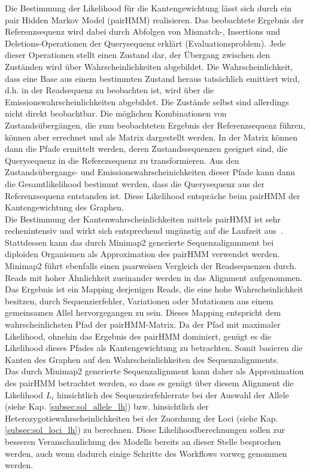 Die Bestimmung der Likelihood für die Kantengewichtung lässt sich durch ein pair Hidden Markov Model (pairHMM) \cite{durbin_1998} realisieren. Das beobachtete Ergebnis der Referenzsequenz wird dabei durch Abfolgen von Mismatch-, Insertions und Deletions-Operationen der Querysequenz erklärt (Evaluationsproblem). Jede dieser Operationen stellt einen Zustand dar, der Übergang zwischen den Zuständen wird über Wahrscheinlichkeiten abgebildet. Die Wahrscheinlichkeit, dass eine Base aus einem bestimmten Zustand heraus tatsächlich emittiert wird, d.h. in der Readsequenz zu beobachten ist, wird über die Emissionswahrscheinlichkeiten abgebildet. Die Zustände selbst sind allerdings nicht direkt beobachtbar. Die möglichen Kombinationen von Zustandsübergängen, die zum beobachteten Ergebnis der Referenzsequenz führen, können aber errechnet und als Matrix dargestellt werden. In der Matrix können dann die Pfade ermittelt werden, deren Zustandssequenzen geeignet sind, die Querysequenz in die Referezsequenz zu transformieren. Aus den Zustandsübergangs- und Emissionswahrscheinichkeiten dieser Pfade kann dann die Gesamtlikelihood bestimmt werden, dass die Querysequenz aus der Referenzsequenz entstanden ist. Diese Likelihood entspräche beim pairHMM der Kantengewichtung des Graphen. \\

Die Bestimmung der Kantenwahrscheinlichkeiten mittels pairHMM ist sehr rechenintensiv und wirkt sich entsprechend ungünstig auf die Laufzeit aus~\cite{durbin_1998, yoon_2009}. Stattdessen kann das durch Minimap2 generierte Sequenzalignmment bei diploiden Organismen als Approximation des pairHMM verwendet werden. Minimap2 führt ebenfalls einen paarweisen Vergleich der Readsequenzen durch. Reads mit hoher Ähnlichkeit zueinander werden in das Alignment aufgenommen. Das Ergebnis ist ein Mapping derjenigen Reads, die eine hohe Wahrscheinlichkeit besitzen, durch Sequenzierfehler, Variationen oder Mutationen aus einem gemeinsamen Allel hervorgegangen zu sein. Dieses Mapping entspricht dem wahrscheinlichsten Pfad der pairHMM-Matrix. Da der Pfad mit maximaler Likelihood, ohnehin das Ergebnis des pairHMM dominiert, genügt es die Likelihood dieses Pfades als Kantengewichtung zu betrachten. Somit basieren die Kanten des Graphen auf den Wahrscheinlichkeiten des Sequenzalignments. \\

Das durch Minimap2 generierte Sequenzalignment kann daher als Approximation des pairHMM betrachtet werden, so dass es genügt über diesem Alignment die Likelihood $ L_{i} $ hinsichtlich des Sequenzierfehlerrate bei der Auswahl der Allele (siehe Kap. \ref{subsec:sol_allele_lh}) bzw. hinsichtlich der Heterozygotiewahrscheinlichkeiten bei der Zuordnung der Loci (siehe Kap. \ref{subsec:sol_loci_lh}) zu berechnen. Diese Likelihoodberechnungen sollen zur besseren Veranschaulichung des Modells bereits an dieser Stelle besprochen werden, auch wenn dadurch einige Schritte des Workflows vorweg genommen werden.

